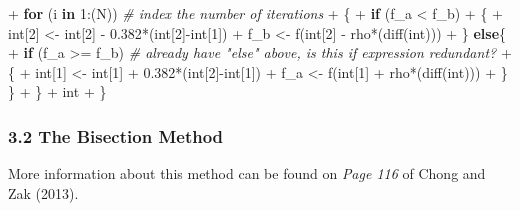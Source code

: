 \documentclass[
]{article}
\newenvironment{Shaded}{\begin{snugshade}}{\end{snugshade}}
\newcommand{\CommentTok}[1]{\textcolor[rgb]{0.56,0.35,0.01}{\textit{#1}}}
\newcommand{\ControlFlowTok}[1]{\textcolor[rgb]{0.13,0.29,0.53}{\textbf{#1}}}
\newcommand{\DecValTok}[1]{\textcolor[rgb]{0.00,0.00,0.81}{#1}}
\newcommand{\FloatTok}[1]{\textcolor[rgb]{0.00,0.00,0.81}{#1}}
\newcommand{\FunctionTok}[1]{\textcolor[rgb]{0.00,0.00,0.00}{#1}}
\newcommand{\NormalTok}[1]{#1}
\newcommand{\OtherTok}[1]{\textcolor[rgb]{0.56,0.35,0.01}{#1}}
\newcommand{\SpecialCharTok}[1]{\textcolor[rgb]{0.00,0.00,0.00}{#1}}
\begin{document}
\begin{Shaded}
\begin{Highlighting}[]
\SpecialCharTok{+}   \ControlFlowTok{for}\NormalTok{ (i }\ControlFlowTok{in} \DecValTok{1}\SpecialCharTok{:}\NormalTok{(N))                    }\CommentTok{\# index the number of iterations}
\SpecialCharTok{+}\NormalTok{   \{}
\SpecialCharTok{+}     \ControlFlowTok{if}\NormalTok{ (f\_a }\SpecialCharTok{\textless{}}\NormalTok{ f\_b)  }
\SpecialCharTok{+}\NormalTok{     \{}
\SpecialCharTok{+}\NormalTok{       int[}\DecValTok{2}\NormalTok{] }\OtherTok{\textless{}{-}}\NormalTok{ int[}\DecValTok{2}\NormalTok{] }\SpecialCharTok{{-}} \FloatTok{0.382}\SpecialCharTok{*}\NormalTok{(int[}\DecValTok{2}\NormalTok{]}\SpecialCharTok{{-}}\NormalTok{int[}\DecValTok{1}\NormalTok{])}
\SpecialCharTok{+}\NormalTok{       f\_b }\OtherTok{\textless{}{-}} \FunctionTok{f}\NormalTok{(int[}\DecValTok{2}\NormalTok{] }\SpecialCharTok{{-}}\NormalTok{ rho}\SpecialCharTok{*}\NormalTok{(}\FunctionTok{diff}\NormalTok{(int)))}
\SpecialCharTok{+}\NormalTok{     \} }\ControlFlowTok{else}\NormalTok{\{}
\SpecialCharTok{+}       \ControlFlowTok{if}\NormalTok{ (f\_a }\SpecialCharTok{\textgreater{}=}\NormalTok{ f\_b) }\CommentTok{\# already have "else" above, is this if expression redundant?}
\SpecialCharTok{+}\NormalTok{       \{}
\SpecialCharTok{+}\NormalTok{         int[}\DecValTok{1}\NormalTok{] }\OtherTok{\textless{}{-}}\NormalTok{ int[}\DecValTok{1}\NormalTok{] }\SpecialCharTok{+} \FloatTok{0.382}\SpecialCharTok{*}\NormalTok{(int[}\DecValTok{2}\NormalTok{]}\SpecialCharTok{{-}}\NormalTok{int[}\DecValTok{1}\NormalTok{])}
\SpecialCharTok{+}\NormalTok{         f\_a }\OtherTok{\textless{}{-}} \FunctionTok{f}\NormalTok{(int[}\DecValTok{1}\NormalTok{] }\SpecialCharTok{+}\NormalTok{ rho}\SpecialCharTok{*}\NormalTok{(}\FunctionTok{diff}\NormalTok{(int)))}
\SpecialCharTok{+}\NormalTok{       \} \}}
\SpecialCharTok{+}\NormalTok{   \}}
\SpecialCharTok{+}\NormalTok{   int}
\SpecialCharTok{+}\NormalTok{ \}}
\end{Highlighting}
\end{Shaded}

\hypertarget{the-bisection-method}{%
\subsubsection{3.2 The Bisection Method}\label{the-bisection-method}}

More information about this method can be found on \emph{Page 116} of
Chong and Zak (2013).
\end{document}
